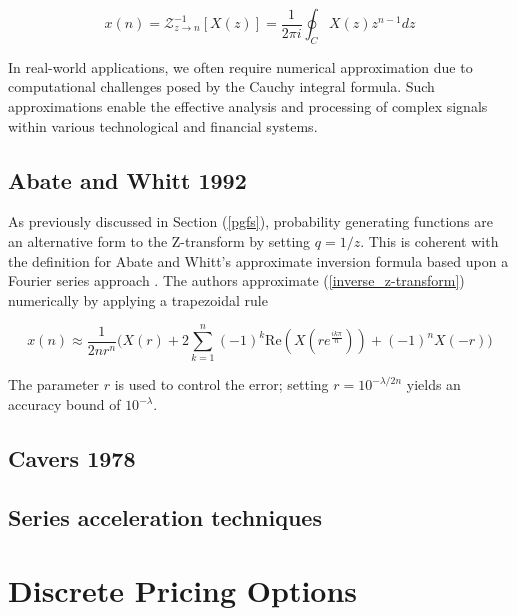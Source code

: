 \documentclass[a4paper]{report}
\begin{document}
\begin{equation}\label{inverse_z-transform}
	x(n) = \mathcal{Z}^{-1}_{z \rightarrow n}[X(z)] = \frac{1}{2\pi i} \oint_C X(z)z^{n-1}dz
\end{equation}

In real-world applications, we often require numerical approximation due to computational challenges posed by the Cauchy integral formula. Such approximations enable the effective analysis and processing of complex signals within various technological and financial systems.
\newline
{}

\subsection{Abate and Whitt 1992}
As previously discussed in Section (\ref{pgfs}), probability generating functions are an alternative form to the Z-transform by setting $q = 1 / z$. This is coherent with the definition for Abate and Whitt's approximate inversion formula based upon a Fourier series approach \cite{AbateWhitt1992a, AbateWhitt1992b}. The authors approximate (\ref{inverse_z-transform}) numerically by applying a trapezoidal rule

\begin{equation}\label{aw_inversion}
	x(n) \approx \frac{1}{2nr^n} \biggr( X(r) + 2\sum^{n}_{k = 1} (-1)^k \text{Re}(X(re^{\frac{ik\pi}{n}})) + (-1)^nX(-r) \biggl)
\end{equation}

The parameter $r$ is used to control the error; setting $r = 10^{-\lambda / 2n}$ yields an accuracy bound of $10^{-\lambda}$.

\subsection{Cavers 1978}

\subsection{Series acceleration techniques}

\section{Discrete Pricing Options}
\end{document}

